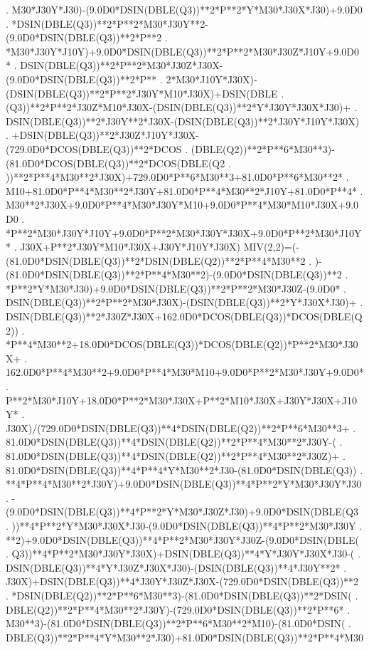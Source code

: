 \begin{framedverbatim}
     . M30*J30Y*J30)-(9.0D0*DSIN(DBLE(Q3))**2*P**2*Y*M30*J30X*J30)+9.0D0
     . *DSIN(DBLE(Q3))**2*P**2*M30*J30Y**2-(9.0D0*DSIN(DBLE(Q3))**2*P**2
     . *M30*J30Y*J10Y)+9.0D0*DSIN(DBLE(Q3))**2*P**2*M30*J30Z*J10Y+9.0D0*
     . DSIN(DBLE(Q3))**2*P**2*M30*J30Z*J30X-(9.0D0*DSIN(DBLE(Q3))**2*P**
     . 2*M30*J10Y*J30X)-(DSIN(DBLE(Q3))**2*P**2*J30Y*M10*J30X)+DSIN(DBLE
     . (Q3))**2*P**2*J30Z*M10*J30X-(DSIN(DBLE(Q3))**2*Y*J30Y*J30X*J30)+
     . DSIN(DBLE(Q3))**2*J30Y**2*J30X-(DSIN(DBLE(Q3))**2*J30Y*J10Y*J30X)
     . +DSIN(DBLE(Q3))**2*J30Z*J10Y*J30X-(729.0D0*DCOS(DBLE(Q3))**2*DCOS
     . (DBLE(Q2))**2*P**6*M30**3)-(81.0D0*DCOS(DBLE(Q3))**2*DCOS(DBLE(Q2
     . ))**2*P**4*M30**2*J30X)+729.0D0*P**6*M30**3+81.0D0*P**6*M30**2*
     . M10+81.0D0*P**4*M30**2*J30Y+81.0D0*P**4*M30**2*J10Y+81.0D0*P**4*
     . M30**2*J30X+9.0D0*P**4*M30*J30Y*M10+9.0D0*P**4*M30*M10*J30X+9.0D0
     . *P**2*M30*J30Y*J10Y+9.0D0*P**2*M30*J30Y*J30X+9.0D0*P**2*M30*J10Y*
     . J30X+P**2*J30Y*M10*J30X+J30Y*J10Y*J30X)
      MIV(2,2)=(-(81.0D0*DSIN(DBLE(Q3))**2*DSIN(DBLE(Q2))**2*P**4*M30**2
     . )-(81.0D0*DSIN(DBLE(Q3))**2*P**4*M30**2)-(9.0D0*DSIN(DBLE(Q3))**2
     . *P**2*Y*M30*J30)+9.0D0*DSIN(DBLE(Q3))**2*P**2*M30*J30Z-(9.0D0*
     . DSIN(DBLE(Q3))**2*P**2*M30*J30X)-(DSIN(DBLE(Q3))**2*Y*J30X*J30)+
     . DSIN(DBLE(Q3))**2*J30Z*J30X+162.0D0*DCOS(DBLE(Q3))*DCOS(DBLE(Q2))
     . *P**4*M30**2+18.0D0*DCOS(DBLE(Q3))*DCOS(DBLE(Q2))*P**2*M30*J30X+
     . 162.0D0*P**4*M30**2+9.0D0*P**4*M30*M10+9.0D0*P**2*M30*J30Y+9.0D0*
     . P**2*M30*J10Y+18.0D0*P**2*M30*J30X+P**2*M10*J30X+J30Y*J30X+J10Y*
     . J30X)/(729.0D0*DSIN(DBLE(Q3))**4*DSIN(DBLE(Q2))**2*P**6*M30**3+
     . 81.0D0*DSIN(DBLE(Q3))**4*DSIN(DBLE(Q2))**2*P**4*M30**2*J30Y-(
     . 81.0D0*DSIN(DBLE(Q3))**4*DSIN(DBLE(Q2))**2*P**4*M30**2*J30Z)+
     . 81.0D0*DSIN(DBLE(Q3))**4*P**4*Y*M30**2*J30-(81.0D0*DSIN(DBLE(Q3))
     . **4*P**4*M30**2*J30Y)+9.0D0*DSIN(DBLE(Q3))**4*P**2*Y*M30*J30Y*J30
     . -(9.0D0*DSIN(DBLE(Q3))**4*P**2*Y*M30*J30Z*J30)+9.0D0*DSIN(DBLE(Q3
     . ))**4*P**2*Y*M30*J30X*J30-(9.0D0*DSIN(DBLE(Q3))**4*P**2*M30*J30Y
     . **2)+9.0D0*DSIN(DBLE(Q3))**4*P**2*M30*J30Y*J30Z-(9.0D0*DSIN(DBLE(
     . Q3))**4*P**2*M30*J30Y*J30X)+DSIN(DBLE(Q3))**4*Y*J30Y*J30X*J30-(
     . DSIN(DBLE(Q3))**4*Y*J30Z*J30X*J30)-(DSIN(DBLE(Q3))**4*J30Y**2*
     . J30X)+DSIN(DBLE(Q3))**4*J30Y*J30Z*J30X-(729.0D0*DSIN(DBLE(Q3))**2
     . *DSIN(DBLE(Q2))**2*P**6*M30**3)-(81.0D0*DSIN(DBLE(Q3))**2*DSIN(
     . DBLE(Q2))**2*P**4*M30**2*J30Y)-(729.0D0*DSIN(DBLE(Q3))**2*P**6*
     . M30**3)-(81.0D0*DSIN(DBLE(Q3))**2*P**6*M30**2*M10)-(81.0D0*DSIN(
     . DBLE(Q3))**2*P**4*Y*M30**2*J30)+81.0D0*DSIN(DBLE(Q3))**2*P**4*M30

\end{framedverbatim}
